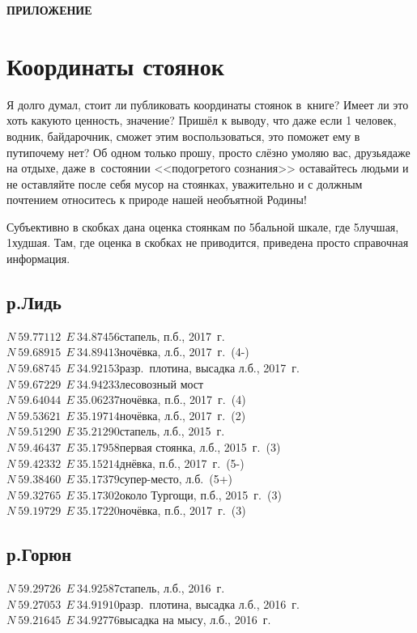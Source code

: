 \newpage
\appendix
\pagestyle{empty}
{\hfill\large\textbf{ПРИЛОЖЕНИЕ}}
\section*{Координаты стоянок}
Я долго думал, стоит ли публиковать координаты стоянок в~книге? Имеет ли это хоть какую\sdash то ценность, значение? Пришёл к выводу, что даже если 1 человек, водник, байдарочник, сможет этим воспользоваться, это поможет ему в пути\mdash почему нет? Об одном только прошу, просто слёзно умоляю вас, друзья\mdash даже на отдыхе, даже в~состоянии <<подогретого сознания>> оставайтесь людьми и не оставляйте после себя мусор на стоянках, уважительно и с должным почтением относитесь к природе нашей необъятной Родины! 

Субъективно в скобках дана оценка стоянкам по 5\sdash бальной шкале, где 5\ndash лучшая, 1\ndash худшая. Там, где оценка в скобках не приводится, приведена просто справочная информация.

\newpage 
\subsection*{р.Лидь}
\noindent ${N~59.77112~~E~34.87456}$\mdash стапель, п.б., 2017~г.\\
${N~59.68915~~E~34.89413}$\mdash ночёвка, л.б., 2017~г.~(4-)\\
${N~59.68745~~E~34.92153}$\mdash разр.~плотина, высадка л.б., 2017~г.\\
${N~59.67229~~E~34.94233}$\mdash лесовозный мост\\
${N~59.64044~~E~35.06237}$\mdash ночёвка, п.б., 2017~г.~(4)\\
${N~59.53621~~E~35.19714}$\mdash ночёвка, л.б., 2017~г.~(2)\\
${N~59.51290~~E~35.21290}$\mdash стапель, л.б., 2015~г.\\
${N~59.46437~~E~35.17958}$\mdash первая стоянка, л.б., 2015~г.~(3)\\
${N~59.42332~~E~35.15214}$\mdash днёвка, п.б., 2017~г.~(5-)\\
${N~59.38460~~E~35.17379}$\mdash супер-место, л.б.~(5+)\\
${N~59.32765~~E~35.17302}$\mdash около Тургощи, п.б., 2015~г.~(3)\\ 
${N~59.19729~~E~35.17220}$\mdash ночёвка, п.б., 2017~г.~(3)\\

\subsection*{р.Горюн}
\noindent ${N~59.29726~~E~34.92587}$\mdash стапель, л.б., 2016~г.\\
${N~59.27053~~E~34.91910}$\mdash разр.~плотина, высадка л.б., 2016~г.\\
${N~59.21645~~E~34.92776}$\mdash высадка на мысу, л.б., 2016~г.\\

